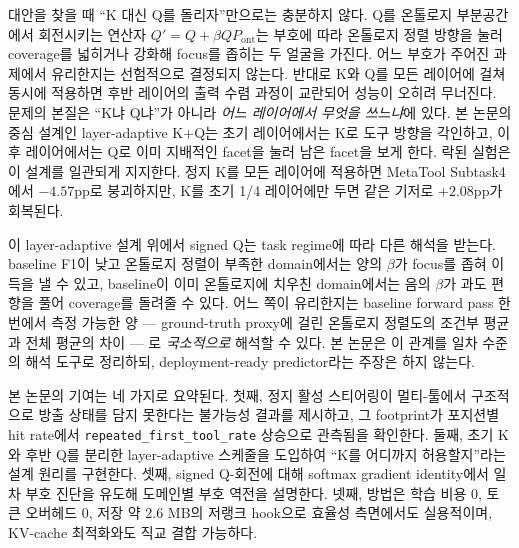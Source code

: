 대안을 찾을 때 ``K 대신 Q를 돌리자''만으로는 충분하지 않다. Q를 온톨로지 부분공간에서 회전시키는 연산자 $Q' = Q + \beta Q P_{\mathrm{ont}}$는 부호에 따라 온톨로지 정렬 방향을 눌러 coverage를 넓히거나 강화해 focus를 좁히는 두 얼굴을 가진다. 어느 부호가 주어진 과제에서 유리한지는 선험적으로 결정되지 않는다. 반대로 K와 Q를 모든 레이어에 걸쳐 동시에 적용하면 후반 레이어의 출력 수렴 과정이 교란되어 성능이 오히려 무너진다. 문제의 본질은 ``K냐 Q냐''가 아니라 \emph{어느 레이어에서 무엇을 쓰느냐}에 있다. 본 논문의 중심 설계인 layer-adaptive K+Q는 초기 레이어에서는 K로 도구 방향을 각인하고, 이후 레이어에서는 Q로 이미 지배적인 facet을 눌러 남은 facet을 보게 한다. 락된 실험은 이 설계를 일관되게 지지한다. 정지 K를 모든 레이어에 적용하면 MetaTool Subtask4에서 $-4.57$pp로 붕괴하지만, K를 초기 1/4 레이어에만 두면 같은 기저로 $+2.08$pp가 회복된다.

이 layer-adaptive 설계 위에서 signed Q는 task regime에 따라 다른 해석을 받는다. baseline F1이 낮고 온톨로지 정렬이 부족한 domain에서는 양의 $\beta$가 focus를 좁혀 이득을 낼 수 있고, baseline이 이미 온톨로지에 치우친 domain에서는 음의 $\beta$가 과도 편향을 풀어 coverage를 돌려줄 수 있다. 어느 쪽이 유리한지는 baseline forward pass 한 번에서 측정 가능한 양 — ground-truth proxy에 걸린 온톨로지 정렬도의 조건부 평균과 전체 평균의 차이 — 로 \emph{국소적으로} 해석할 수 있다. 본 논문은 이 관계를 일차 수준의 해석 도구로 정리하되, deployment-ready predictor라는 주장은 하지 않는다.

본 논문의 기여는 네 가지로 요약된다. 첫째, 정지 활성 스티어링이 멀티-툴에서 구조적으로 방출 상태를 담지 못한다는 불가능성 결과를 제시하고, 그 footprint가 포지션별 hit rate에서 \texttt{repeated\_first\_tool\_rate} 상승으로 관측됨을 확인한다. 둘째, 초기 K와 후반 Q를 분리한 layer-adaptive 스케줄을 도입하여 ``K를 어디까지 허용할지''라는 설계 원리를 구현한다. 셋째, signed Q-회전에 대해 softmax gradient identity에서 일차 부호 진단을 유도해 도메인별 부호 역전을 설명한다. 넷째, 방법은 학습 비용 0, 토큰 오버헤드 0, 저장 약 2.6 MB의 저랭크 hook으로 효율성 측면에서도 실용적이며, KV-cache 최적화와도 직교 결합 가능하다.

